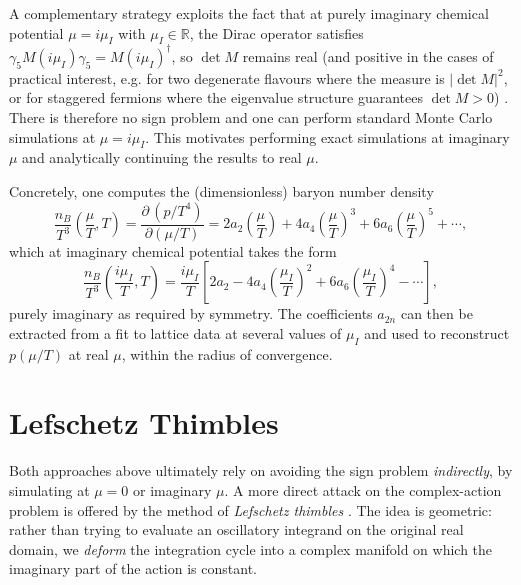 \documentclass[11pt]{article}
\theoremstyle{definition}
\begin{document}
A complementary  strategy exploits the fact that at purely imaginary chemical
potential $\mu = i\mu_I$ with $\mu_I \in \mathbb{R}$, the Dirac operator
satisfies $\gamma_5 M(i\mu_I)\gamma_5 = M(i\mu_I)^\dagger$, so $\det M$
remains real (and positive in the cases of practical interest, e.g. for two degenerate flavours where the measure is $|\det M|^2$, or for staggered fermions where the eigenvalue structure guarantees $\det M > 0$)
\cite{deForcrand2002, DElia2002}. There is therefore no sign problem and one
can perform standard Monte Carlo simulations at $\mu = i\mu_I$. This motivates
performing exact simulations at imaginary $\mu$ and analytically
continuing the results to real $\mu$.

Concretely, one computes the (dimensionless) baryon number density
\begin{equation}
  \frac{n_B}{T^3}\!\left(\frac{\mu}{T},T\right)
  = \frac{\partial\,(p/T^4)}{\partial(\mu/T)}
  = 2a_2\!\left(\frac{\mu}{T}\right)
    + 4a_4\!\left(\frac{\mu}{T}\right)^{\!3}
    + 6a_6\!\left(\frac{\mu}{T}\right)^{\!5} + \cdots ,
\end{equation}
which at imaginary chemical potential takes the form
\begin{equation}
  \frac{n_B}{T^3}\!\left(\frac{i\mu_I}{T},T\right)
  = \frac{i\mu_I}{T}\!\left[2a_2
    - 4a_4\!\left(\frac{\mu_I}{T}\right)^{\!2}
    + 6a_6\!\left(\frac{\mu_I}{T}\right)^{\!4} - \cdots\right] ,
\end{equation}
purely imaginary as required by symmetry. The coefficients $a_{2n}$ can then
be extracted from a fit to lattice data at several values of $\mu_I$ and used
to reconstruct $p(\mu/T)$ at real $\mu$, within the radius of convergence.

\section{Lefschetz Thimbles}

Both approaches above ultimately rely on avoiding the sign problem
\emph{indirectly}, by simulating at $\mu=0$ or imaginary $\mu$. A more direct
attack on the complex-action problem is offered by the method of
\emph{Lefschetz thimbles} \cite{Cristoforetti2012, Fujii2013}. The idea is
geometric: rather than trying to evaluate an oscillatory integrand on the
original real domain, we \emph{deform} the integration cycle into a complex
manifold on which the imaginary part of the action is constant.
\end{document}

